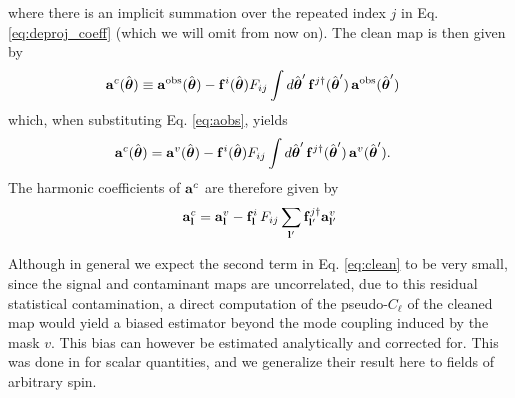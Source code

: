 \documentclass[usenatbib]{mnrasb}
\newcommand{\nv}{\hat{\boldsymbol{\theta}}}
\begin{document}
      where there is an implicit summation over the repeated index $j$ in Eq. \ref{eq:deproj_coeff} (which we will omit from now on). The clean map is then given by
      \begin{align}
        {\bf a}^c(\nv)
        &\equiv{\bf a}^{\rm obs}(\nv)-{\bf f}^i(\nv)F_{ij}\int d\nv'\,{\bf f}^{j\dag}(\nv')\,{\bf a}^{\rm obs}(\nv')
      \end{align}
      which, when substituting Eq. \ref{eq:aobs}, yields
      \begin{align}\label{eq:clean}
        {\bf a}^c(\nv)&={\bf a}^v(\nv)-{\bf f}^i(\nv)F_{ij}\int d\nv'\,{\bf f}^{j\dag}(\nv')\,{\bf a}^v(\nv').
      \end{align}      
      The harmonic coefficients of ${\bf a}^c$ are therefore given by
      \begin{equation}\label{eq:clean_f}
        {\bf a}^c_{\bf l}={\bf a}^v_{\bf l}-{\bf f}^i_{\bf l}\,F_{ij}\sum_{{\bf l}'}{\bf f}^{j\dag}_{{\bf l}'}{\bf a}^v_{{\bf l}'}
      \end{equation}
      
      Although in general we expect the second term in Eq. \ref{eq:clean} to be very small, since the signal and contaminant maps are uncorrelated, due to this residual statistical contamination, a direct computation of the pseudo-$C_\ell$ of the cleaned map would yield a biased estimator beyond the mode coupling induced by the mask $v$. This bias can however be estimated analytically and corrected for. This was done in \cite{2017MNRAS.465.1847E} for scalar quantities, and we generalize their result here to fields of arbitrary spin.
      
\end{document}
